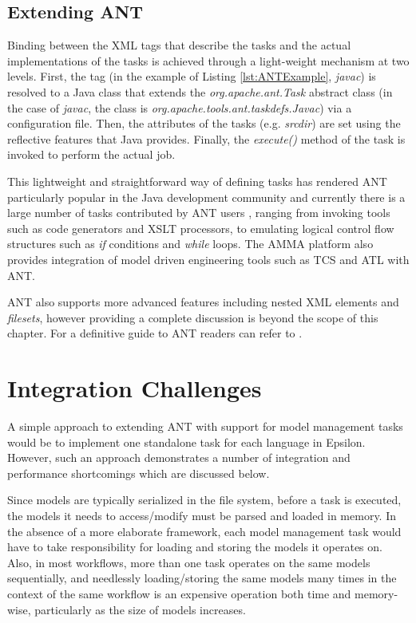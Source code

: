\subsection{Extending ANT}

Binding between the XML tags that describe the tasks and the actual implementations of the tasks is achieved through a light-weight mechanism at two levels. First, the tag (in the example of Listing \ref{lst:ANTExample}, \emph{javac}) is resolved to a Java class that extends the \emph{org.apache.ant.Task} abstract class (in the case of \emph{javac}, the class is \emph{org.apache.tools.ant.taskdefs.Javac}) via a configuration file. Then, the attributes of the tasks (e.g. \emph{srcdir}) are set using the reflective features that Java provides. Finally, the \emph{execute()} method of the task is invoked to perform the actual job.

This lightweight and straightforward way of defining tasks has rendered ANT particularly popular in the Java development community and currently there is a large number of tasks contributed by ANT users \cite{AntExternalTasks}, ranging from invoking tools such as code generators and XSLT processors, to emulating logical control flow structures such as \emph{if} conditions and \emph{while} loops. The AMMA platform \cite{AMMA} also provides integration of model driven engineering tools such as TCS \cite{TCS} and ATL \cite{ATL} with ANT.

ANT also supports more advanced features including nested XML elements and \emph{filesets}, however providing a complete discussion is beyond the scope of this chapter. For a definitive guide to ANT readers can refer to \cite{AntBook}.

\section{Integration Challenges}
\label{sec:Workflow.IntegrationChallenges}

A simple approach to extending ANT with support for model management tasks would be to implement one standalone task for each language in Epsilon. However, such an approach demonstrates a number of integration and performance shortcomings which are discussed below. 

Since models are typically serialized in the file system, before a task is executed, the models it needs to access/modify must be parsed and loaded in memory. In the absence of a more elaborate framework, each model management task would have to take responsibility for loading and storing the models it operates on. Also, in most workflows, more than one task operates on the same models sequentially, and needlessly loading/storing the same models many times in the context of the same workflow is an expensive operation both time and memory-wise, particularly as the size of models increases.

